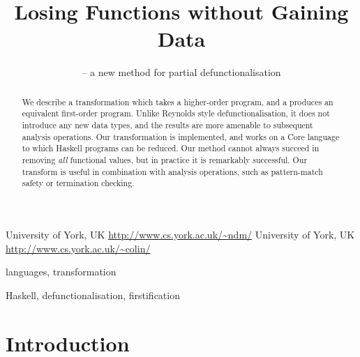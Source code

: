 \documentclass[preprint]{sigplanconf}
\begin{document}
\copyrightdata{[to be supplied]}

\titlebanner{} %
\preprintfooter{}   %

\title{Losing Functions without Gaining Data}
\subtitle{ -- a new method for partial defunctionalisation}

           {University of York, UK}
           {\url{http://www.cs.york.ac.uk/~ndm/}}
           {University of York, UK}
           {\url{http://www.cs.york.ac.uk/~colin/}}

\maketitle

\begin{abstract}
We describe a transformation which takes a higher-order program, and a produces an equivalent first-order program. Unlike Reynolds style defunctionalisation, it does not introduce any new data types, and the results are more amenable to subsequent analysis operations. Our transformation is implemented, and works on a Core language to which Haskell programs can be reduced. Our method cannot always succeed in removing \textit{all} functional values, but in practice it is remarkably successful. Our transform is useful in combination with analysis operations, such as pattern-match safety or termination checking.
\end{abstract}


\terms
languages, transformation

\keywords
Haskell, defunctionalisation, firstification


\section{Introduction}

\end{document}
